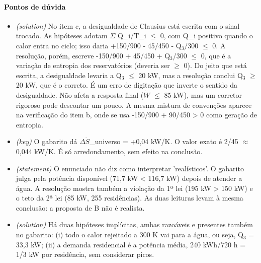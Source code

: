 \documentclass{article}%
\begin{document}
\paragraph{Pontos de dúvida}%
\begin{itemize}%
\item%
\textit{(solution)} No item c, a desigualdade de Clausius está escrita com o sinal trocado. As hipóteses adotam $\Sigma$ Q\_i/T\_i $\leq$ 0, com Q\_i positivo quando o calor entra no ciclo; isso daria +150/900 - 45/450 - Q$_{3}$/300 $\leq$ 0. A resolução, porém, escreve -150/900 + 45/450 + Q$_{3}$/300 $\leq$ 0, que é a variação de entropia dos reservatórios (deveria ser $\geq$ 0). Do jeito que está escrita, a desigualdade levaria a Q$_{3}$ $\leq$ 20 kW, mas a resolução conclui Q$_{3}$ $\geq$ 20 kW, que é o correto. É um erro de digitação que inverte o sentido da desigualdade. Não afeta a resposta final ($\dot W$ $\leq$ 85 kW), mas um corretor rigoroso pode descontar um pouco. A mesma mistura de convenções aparece na verificação do item b, onde se usa -150/900 + 90/450 > 0 como geração de entropia.%
\item%
\textit{(key)} O gabarito dá $\Delta$$\dot S$\_universo = +0,04 kW/K. O valor exato é 2/45 $\approx$ 0,044 kW/K. É só arredondamento, sem efeito na conclusão.%
\item%
\textit{(statement)} O enunciado não diz como interpretar 'realísticos'. O gabarito julga pela potência disponível (71,7 kW < 116,7 kW) depois de atender a água. A resolução mostra também a violação da 1ª lei (195 kW > 150 kW) e o teto da 2ª lei (85 kW, 255 residências). As duas leituras levam à mesma conclusão: a proposta de B não é realista.%
\item%
\textit{(solution)} Há duas hipóteses implícitas, ambas razoáveis e presentes também no gabarito: (i) todo o calor rejeitado a 300 K vai para a água, ou seja, Q$_{3}$ = 33,3 kW; (ii) a demanda residencial é a potência média, 240 kWh/720 h = 1/3 kW por residência, sem considerar picos.%
\end{itemize}%
\end{document}
